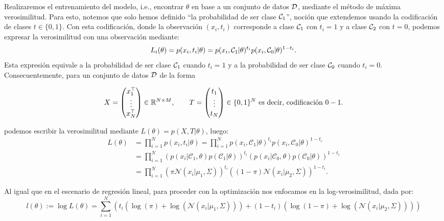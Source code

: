 Realizaremos el entrenamiento del modelo, i.e., encontrar $\theta$ en base a un conjunto de datos ${\mathcal D}$, mediante el método de máxima verosimilitud. Para esto, notemos que solo hemos definido ``la probabilidad de ser clase ${\mathcal C}_1$'', noción que extendemos usando la codificación de clases $t\in\{0,1\}$.  Con esta codificación, donde la observación $(x_i,t_i)$ corresponde a clase ${\mathcal C}_1$ con $t_i = 1$ y a clase ${\mathcal C}_2$ con  $t=0$, podemos expresar la verosimilitud con una observación mediante:
\begin{equation}
	L_i(\theta) = p(x_i, t_i|\theta) =  p(x_i,{\mathcal C}_1|\theta)^{t_i}p(x_i,{\mathcal C}_0|\theta)^{1-t_i}. 
\end{equation}
Esta expresión equivale a la probabilidad de ser clase ${\mathcal C}_1$ cuando $t_i=1$ y a la probabilidad de ser clase ${\mathcal C}_0$ cuando $t_i=0$. Consecuentemente, para un conjunto de datos ${\mathcal D}$ de la forma

\begin{equation}
X=\left(\begin{matrix}
		x_1^\top\\ \vdots\\ x_N^\top
	\end{matrix}\right)\in\mathbb{R}^{N\times M},\qquad
	T=\left(\begin{matrix}
		t_1\\ \vdots\\ t_N
	\end{matrix}\right)\in\{0,1\}^N \text{ es decir, codificación $0-1$.}
\end{equation}

podemos escribir la verosimilitud mediante $L(\theta) = p(X,T|\theta) $, luego:
\begin{align}
	L(\theta) &= \prod_{i=1}^{N}p(x_i,t_i|\theta)
	= \prod_{i=1}^{N}p(x_i,\mathcal{C}_1|\theta)^{t_i}p(x_i,\mathcal{C}_0|\theta)^{1-t_i}\\
	&=\prod_{i=1}^{N}\left(p(x_i|\mathcal{C}_1,\theta)p(\mathcal{C}_1|\theta)\right)^{t_i}\left(p(x_i|\mathcal{C}_0,\theta)p(\mathcal{C}_0|\theta)\right)^{1-t_i}\\
	&= \prod_{i=1}^{N}(\pi\mathcal{N}(x_i|\mu_1,\Sigma))^{t_i}
	((1-\pi)\mathcal{N}(x_i|\mu_2,\Sigma))^{1-t_i}.
	\end{align}

Al igual que en el escenario de regresión lineal, para proceder con la optimización nos enfocamos en la log-verosimilitud, dada por:	
	\begin{equation}
	l(\theta) := \log L(\theta) = \sum_{i=1}^{N}\left(t_i(\log(\pi)+\log(\mathcal{N}(x_i|\mu_1,\Sigma)))+(1-t_i)(\log(1-\pi)+\log(\mathcal{N}(x_i|\mu_2,\Sigma)))\right) 
		\end{equation}

